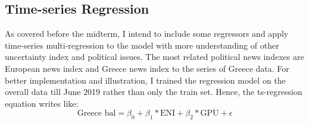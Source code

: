 \documentclass[12pt]{article}
\begin{document}
\begin{figure}[!tbp]
\begin{minipage}[b]{0.34\textwidth}
    \caption{}
  \end{minipage}
\end{figure}

\subsection{Time-series Regression}
As covered before the midterm, I intend to include some regressors and apply time-series multi-regression to the model with more understanding of other uncertainty index and political issues. The most related political news indexes are European news index and Greece news index to the series of Greece data. For better implementation and illustration, I trained the regression model on the overall data till June 2019 rather than only the train set. Hence, the ts-regression equation writes like: 
$$
\text{Greece bal} = \beta_0 + \beta_1 * \text{ENI} + \beta_2 * \text{GPU} + \epsilon
$$
\end{document}
